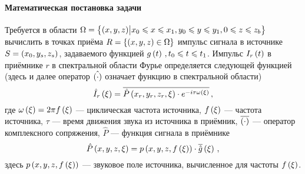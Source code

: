 \documentclass[../document.tex]{subfiles}
\begin{document}
            \paragraph{Математическая постановка задачи}
                \par Требуется в области $\Omega=\left\{\left(x,y,z\right)\bigr|x_0\leqslant x\leqslant x_1,y_0\leqslant y\leqslant y_1,0\leqslant z\leqslant z_b\right\}$ вычислить в точках приёма $R=\left\{\left(x,y,z\right)\in\Omega\right\}$ импульс сигнала в источнике $S=\left(x_0, y_s, z_s\right)$, задаваемого функцией $g\left(t\right)\,,t_0\leqslant t\leqslant t_1$. Импульс $I_r\left(t\right)$ в приёмнике $r$ в спектральной области Фурье определяется следующей функцией (здесь и далее оператор $\hat{\left(\cdot\right)}$ означает функцию в спектральной области)
                \begin{equation}
                    \hat{I}_r\left(\xi\right)=\overline{\hat{P}\left(x_r,y_r,z_r, \xi\right)\cdot e^{-i\tau\omega\left(\xi\right)}}\,,
                \end{equation}
                где $\omega\left(\xi\right)=2\pi f\left(\xi\right)$ --- циклическая частота источника, $f\left(\xi\right)$ --- частота источника, $\tau$ --- время движения звука из источника в приёмник, $\overline{\left(\cdot\right)}$ --- оператор комплексного сопряжения, $\hat{P}$ --- функция сигнала в приёмнике
                \begin{equation}
                    \hat{P}\left(x,y,z,\xi\right)=p\left(x,y,z,f\left(\xi\right)\right)\cdot\overline{\hat{g}}\left(\xi\right)\,,
                \end{equation}
                здесь $p\left(x,y,z,f\left(\xi\right)\right)$ --- звуковое поле источника, вычисленное для частоты $f\left(\xi\right)$.
\end{document}

